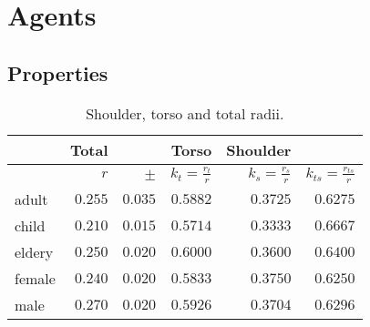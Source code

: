 \section{Agents}
\subsection{Properties}

\begin{table}[H]
\begin{tabularx}{1.0\linewidth}{ l r r r r r}
& Total && Torso & Shoulder & \\
\hline
& $ r $ & $ \pm $ & $ k_{t} = \frac{r_{t}}{r} $ & $ k_{s} = \frac{r_{s}}{r} $ & $ k_{ts} = \frac{r_{ts}}{r} $ \\
\hline\hline
adult & $ 0.255 $ & $ 0.035 $ & $ 0.5882 $ & $ 0.3725 $ & $ 0.6275 $ \\
child & $ 0.210 $ & $ 0.015 $ & $ 0.5714 $ & $ 0.3333 $ & $ 0.6667 $ \\
eldery & $ 0.250 $ & $ 0.020 $ & $ 0.6000 $ & $ 0.3600 $ & $ 0.6400 $ \\
female & $ 0.240 $ & $ 0.020 $ & $ 0.5833 $ & $ 0.3750 $ & $ 0.6250 $ \\
male & $ 0.270 $ & $ 0.020 $ & $ 0.5926 $ & $ 0.3704 $ & $ 0.6296 $ \\
\hline
\end{tabularx} 
\caption{Shoulder, torso and total radii.}
\end{table}


